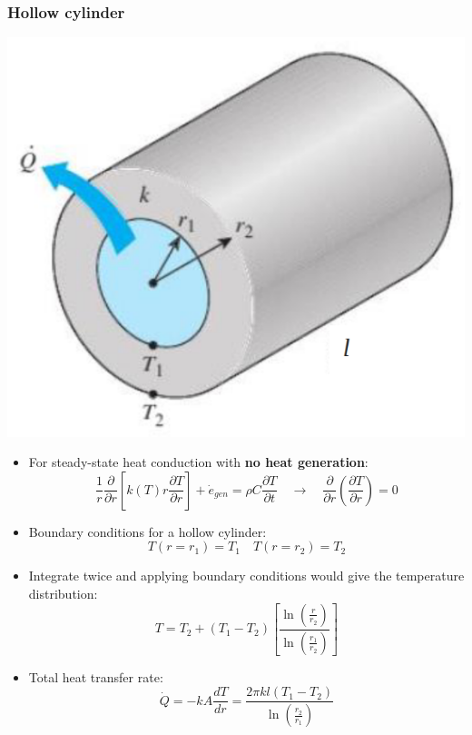 \documentclass[11pt]{article}
\begin{document}
\subsubsection{Hollow cylinder}
\label{sec:org16315ef}
\begin{center}
\includegraphics[width=.9\linewidth]{./images/steady-state-heat-conduction-hollow-cylinder.png}
\end{center}
\begin{itemize}
\item For steady-state heat conduction with \textbf{no heat generation}:
\[\frac{1}{r} \frac{\partial}{\partial r} \left[k(T) r \frac{\partial T}{\partial r} \right] + \dot{e}_{gen} = \rho C \frac{\partial T}{\partial t} \quad \rightarrow \quad \frac{\partial}{\partial r} \left(\frac{\partial T}{\partial r} \right) = 0\]
\item Boundary conditions for a hollow cylinder:
\[T(r = r_1) = T_1 \quad T(r = r_2) = T_2\]
\item Integrate twice and applying boundary conditions would give the temperature distribution:
\[T = T_2 + (T_1 - T_2) \left[\frac{\ln \left( \frac{r}{r_2} \right)}{\ln \left( \frac{r_1}{r_2} \right)} \right]\]
\item Total heat transfer rate:
\[\dot{Q} = -kA \frac{dT}{dr} = \frac{2 \pi kl (T_1 - T_2)}{\ln \left(\frac{r_2}{r_1} \right)}\]
\end{itemize}
\end{document}
